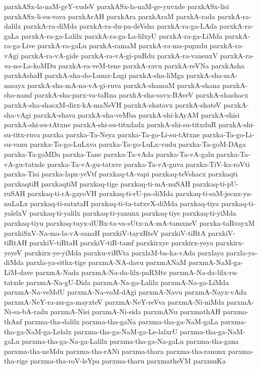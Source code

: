 {parxkASx-la-naM-geY-vudeV
parxkASx-la-naM-ge-yuvxde
parxkASx-lisi
parxkASx-li-su-vava
parxkArAH
parxkAra
parxkAraM
parxkA-rada
parxkA-ra-dalilx
parxkA-ra-diMda
parxkA-ra-du-pa-deVsha
parxkA-ra-ga-LAda
parxkA-ra-gaLa
parxkA-ra-ga-Lalilx
parxkA-ra-ga-La-lilxyU
parxkA-ra-ga-LiMda
parxkA-ra-ga-Live
parxkA-ra-gaLu
parxkA-ramaM
parxkA-ra-ma-pupxdu
parxkA-ra-vAgi
parxkA-ra-vA-gide
parxkA-ra-vA-gi-puRdu
parxkA-ra-vanenxV
parxkA-ra-va-no-La-koMDu
parxkA-ra-veM-tene
parxkA-ravu
parxkA-reVNa
parxkAsha
parxkAshaH
parxkA-sha-do-Lumx-Lugi
parxkA-sha-liMga
parxkA-sha-mA-nasayx
parxkA-sha-mA-na-vA-gi-ruva
parxkA-shamaM
parxkA-shana
parxkA-sha-namf
parxkA-sha-parx-va-taRna
parxkA-sha-savx-BAveV
parxkA-shashacx
parxkA-sha-shacxM-dirx-kA-maNeVH
parxkA-shatavx
parxkA-shateV
parxkA-sha-vAgi
parxkA-shava
parxkA-sha-veMba
parxkA-shi-kAyAM
parxkA-shisi
parxkA-shi-su-tAtxne
parxkA-shi-su-titxdadx
parxkA-shi-su-titxduR
parxkA-shi-su-titx-ruva
parxka
parxka-Ta-Neya
parxka-Ta-go-Li-su-tAtxne
parxka-Ta-go-Li-su-vanu
parxka-Ta-go-LuLxva
parxka-Ta-go-LuLx-vudu
parxka-Ta-goM-DAga
parxka-Ta-goMDa
parxka-Tane
parxka-Ta-vAda
parxka-Ta-vA-galu
parxka-Ta-vA-gu-tatxde
parxka-Ta-vA-gu-tatxve
parxka-Ta-vA-guva
parxka-TiV-ka-roVti
parxka-Tisi
parxka-lapx-yeVtf
parxkaq-tA-vapi
parxkaq-teVshacx
parxkaqti
parxkaqtiH
parxkaqtiM
parxkaq-tige
parxkaq-ti-mA-nuSAH
parxkaq-ti-pU-ruSAH
parxkaq-ti-rA-gayoVH
parxkaq-ti-rU-pa-diMda
parxkaq-ti-saM-jecnx-ya-nuLaLx
parxkaq-ti-satxtaH
parxkaq-ti-ta-tatxvX-diMda
parxkaq-tiya
parxkaq-ti-yalelxV
parxkaq-ti-yalilx
parxkaq-ti-yanunx
parxkaq-tiye
parxkaq-ti-yiMda
parxkaq-tiyu
parxkaq-tuyx-dUBx-ta-va-sUtx-nA-mA-tamxneV
parxka-taRvayxM
parxkiSxV-Na-ma-la-vA-sanaH
parxkiV-tayxRteV
parxkiV-tiRtA
parxkiV-tiRtAH
parxkiV-tiRtaH
parxkiV-tiR-tamf
parxkirxye
parxkirx-yeya
parxkirx-yeyeV
parxkirx-ye-yiMda
parxku-viRVta
parxlaM-ba-ka-vAda
parxlaya
parxla-ya-diMda
parxla-ya-sithx-tige
parxmA-NA-davu
parxmANaM
parxmA-NaM-ga-LiM-dave
parxmA-Nada
parxmA-Na-da-lilx-paRMte
parxmA-Na-da-lilx-ru-tatxde
parxmA-Na-gU-Dida
parxmA-Na-ga-Lalilx
parxmA-Na-ga-LiMda
parxmA-Na-veMdU
parxmA-Na-voM-dAgi
parxmA-Navu
parxmA-Nayx-vAda
parxmA-NeY-ra-nu-ga-mayxteV
parxmA-NeY-reVva
parxmA-Ni-niMda
parxmA-Ni-sa-bA-radu
parxmA-Nisi
parxmA-Ni-sida
parxmANu
parxmathAH
parxma-thAnf
parxma-tha-dalilx
parxma-tha-gaNa
parxma-tha-ga-NaM-gaLa
parxma-tha-ga-NaM-ga-Lelalx
parxma-tha-ga-NaM-ga-Le-lalxrU
parxma-tha-ga-NaM-gaLu
parxma-tha-ga-Na-ga-Lalilx
parxma-tha-ga-Na-gaLu
parxma-tha-gana
parxma-tha-neMdu
parxma-tha-rANi
parxma-thara
parxma-tha-ranunx
parxma-tha-rige
parxma-tha-roV-leYpa
parxma-tharu
parxmatheVM
parxmuKa
}

